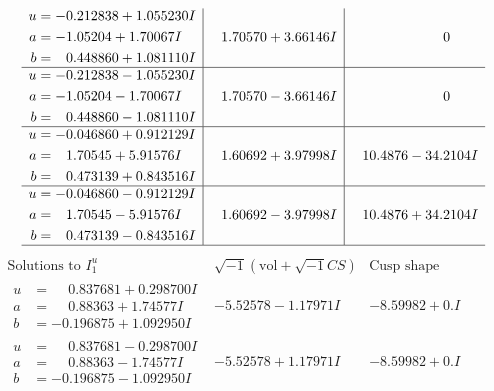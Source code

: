 \documentclass[1p]{elsarticle_modified}
\theoremstyle{definition}
\newcommand{\I}{\sqrt{-1}}
\begin{document}
$$\begin{array}{c|c|c}
\begin{aligned}
u &= -0.212838 + 1.055230 I \\
a &= -1.05204 + 1.70067 I \\
b &= \phantom{-}0.448860 + 1.081110 I\end{aligned}
 & \phantom{-}1.70570 + 3.66146 I & \phantom{-0.000000 } 0 \\ \hline\begin{aligned}
u &= -0.212838 - 1.055230 I \\
a &= -1.05204 - 1.70067 I \\
b &= \phantom{-}0.448860 - 1.081110 I\end{aligned}
 & \phantom{-}1.70570 - 3.66146 I & \phantom{-0.000000 } 0 \\ \hline\begin{aligned}
u &= -0.046860 + 0.912129 I \\
a &= \phantom{-}1.70545 + 5.91576 I \\
b &= \phantom{-}0.473139 + 0.843516 I\end{aligned}
 & \phantom{-}1.60692 + 3.97998 I & \phantom{-}10.4876 - 34.2104 I \\ \hline\begin{aligned}
u &= -0.046860 - 0.912129 I \\
a &= \phantom{-}1.70545 - 5.91576 I \\
b &= \phantom{-}0.473139 - 0.843516 I\end{aligned}
 & \phantom{-}1.60692 - 3.97998 I & \phantom{-}10.4876 + 34.2104 I\\
 \hline 
 \end{array}$$\newpage$$\begin{array}{c|c|c}  
\text{Solutions to }I^u_{1}& \I (\text{vol} + \sqrt{-1}CS) & \text{Cusp shape}\\
 \hline 
\begin{aligned}
u &= \phantom{-}0.837681 + 0.298700 I \\
a &= \phantom{-}0.88363 + 1.74577 I \\
b &= -0.196875 + 1.092950 I\end{aligned}
 & -5.52578 - 1.17971 I & -8.59982 + 0. I\phantom{ +0.000000I} \\ \hline\begin{aligned}
u &= \phantom{-}0.837681 - 0.298700 I \\
a &= \phantom{-}0.88363 - 1.74577 I \\
b &= -0.196875 - 1.092950 I\end{aligned}
 & -5.52578 + 1.17971 I & -8.59982 + 0. I\phantom{ +0.000000I} \\ \hline\begin{aligned}

\end{aligned}
\end{array}$$
\end{document}
